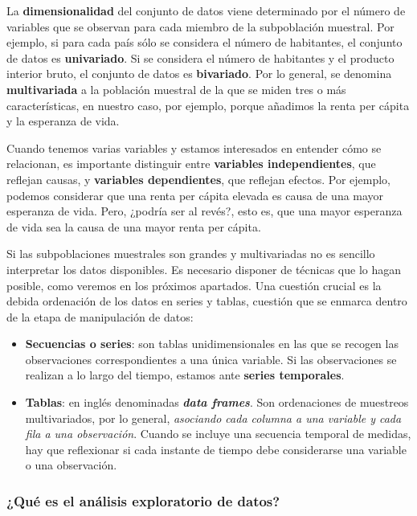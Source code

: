 \documentclass[11pt]{article}
\providecommand{\tightlist}{%
      \setlength{\itemsep}{0pt}\setlength{\parskip}{0pt}}
\begin{document}
La \textbf{dimensionalidad} del conjunto de datos viene determinado por
el número de variables que se observan para cada miembro de la
subpoblación muestral. Por ejemplo, si para cada país sólo se considera
el número de habitantes, el conjunto de datos es \textbf{univariado}. Si
se considera el número de habitantes y el producto interior bruto, el
conjunto de datos es \textbf{bivariado}. Por lo general, se denomina
\textbf{multivariada} a la población muestral de la que se miden tres o
más características, en nuestro caso, por ejemplo, porque añadimos la
renta per cápita y la esperanza de vida.

    Cuando tenemos varias variables y estamos interesados en entender cómo
se relacionan, es importante distinguir entre \textbf{variables
independientes}, que reflejan causas, y \textbf{variables dependientes},
que reflejan efectos. Por ejemplo, podemos considerar que una renta per
cápita elevada es causa de una mayor esperanza de vida. Pero, ¿podría
ser al revés?, esto es, que una mayor esperanza de vida sea la causa de
una mayor renta per cápita.

Si las subpoblaciones muestrales son grandes y multivariadas no es
sencillo interpretar los datos disponibles. Es necesario disponer de
técnicas que lo hagan posible, como veremos en los próximos apartados.
Una cuestión crucial es la debida ordenación de los datos en series y
tablas, cuestión que se enmarca dentro de la etapa de manipulación de
datos:

\begin{itemize}
\tightlist
\item
  \textbf{Secuencias o series}: son tablas unidimensionales en las que
  se recogen las observaciones correspondientes a una única variable. Si
  las observaciones se realizan a lo largo del tiempo, estamos ante
  \textbf{series temporales}.
\item
  \textbf{Tablas}: en inglés denominadas \textbf{\emph{data frames}}.
  Son ordenaciones de muestreos multivariados, por lo general,
  \emph{asociando cada columna a una variable y cada fila a una
  observación}. Cuando se incluye una secuencia temporal de medidas, hay
  que reflexionar si cada instante de tiempo debe considerarse una
  variable o una observación.
\end{itemize}

    \subsubsection*{¿Qué es el análisis exploratorio de
datos?}\label{quuxe9-es-el-anuxe1lisis-exploratorio-de-datos}
\end{document}
